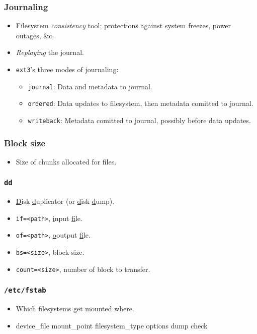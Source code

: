 \documentclass[xcolor={dvipsnames,svgnames},hyperref=dvips]{beamer}
\begin{document}
	\begin{frame}
		\frametitle{Journaling}
		\begin{itemize}
		\item Filesystem \emph{consistency} tool; protections against system freezes, power outages, \&c.
		\item \emph{Replaying} the journal.
		\item \texttt{ext3}'s three modes of journaling:
			\begin{itemize}
			\item \texttt{journal}: Data and metadata to journal.
			\item \texttt{ordered}: Data updates to filesystem, then metadata comitted to journal.
			\item \texttt{writeback}: Metadata comitted to journal, possibly before data updates.
			\end{itemize}
		\end{itemize}
	\end{frame}

	\begin{frame}
		\frametitle{Block size}
		\begin{itemize}
			\item Size of chunks allocated for files.
		\end{itemize}
	\end{frame}

	\begin{frame}
		\frametitle{\texttt{dd}}
		\begin{itemize}
			\item \underline{D}isk \underline{d}uplicator (or \underline{d}isk \underline{d}ump).
			\item \texttt{if=<path>}, \underline{i}nput \underline{f}ile.
			\item \texttt{of=<path>}, \underline{o}output \underline{f}ile.
			\item \texttt{bs=<size>}, block size.
			\item \texttt{count=<size>}, number of block to transfer.
		\end{itemize}
	\end{frame}

	\begin{frame}
		\frametitle{\texttt{/etc/fstab}}
		\begin{itemize}
			\item Which filesystems get mounted where.
			\item device\_file mount\_point filesystem\_type options dump check
		\end{itemize}
	\end{frame}
\end{document}
